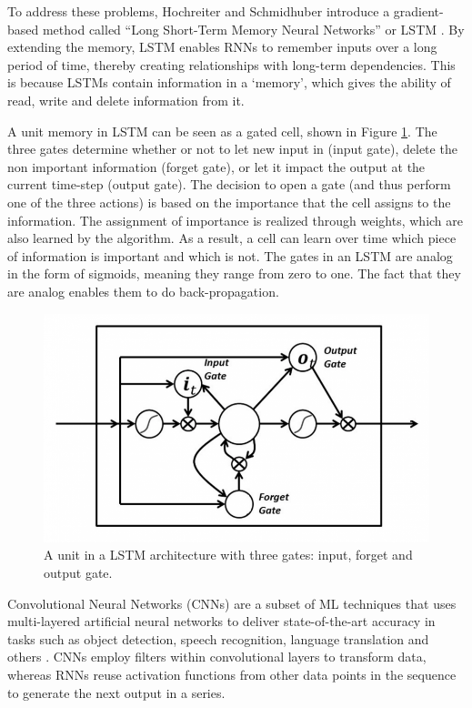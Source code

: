 To address these problems, Hochreiter and Schmidhuber introduce a gradient-based method called ``Long Short-Term Memory Neural Networks'' or LSTM \cite{HochSchm1997}. By extending the memory, LSTM enables RNNs to remember inputs over a long period of time, thereby creating relationships with long-term dependencies. This is because LSTMs contain information in a `memory', which gives the ability of read, write and delete information from it.

A unit memory in LSTM can be seen as a gated cell, shown in Figure \ref{Fig:LSTM-Unit}. The three gates determine whether or not to let new input in (input gate), delete the non important information (forget gate), or let it impact the output at the current time-step (output gate). The decision to open a gate (and thus perform one of the three actions) is based on the importance that the cell assigns to the information. The assignment of importance is realized through weights, which are also learned by the algorithm. As a result, a cell can learn over time which piece of information is important and which is not. The gates in an LSTM are analog in the form of sigmoids, meaning they range from zero to one. The fact that they are analog enables them to do back-propagation.

\begin{figure}[htb]
	\centering
	\includegraphics[scale=0.4]{../Figures/rnn-three-gates}
	\caption{A unit in a LSTM architecture with three gates: input, forget and output gate. }
	\label{Fig:LSTM-Unit}
\end{figure}

Convolutional Neural Networks (CNNs) \cite{Lecun1989} are a subset of ML techniques that uses multi-layered artificial neural networks to deliver state-of-the-art accuracy in tasks such as object detection, speech recognition, language translation and others \cite{Szegedy2013}. CNNs employ filters within convolutional layers to transform data, whereas RNNs reuse activation functions from other data points in the sequence to generate the next output in a series. 

